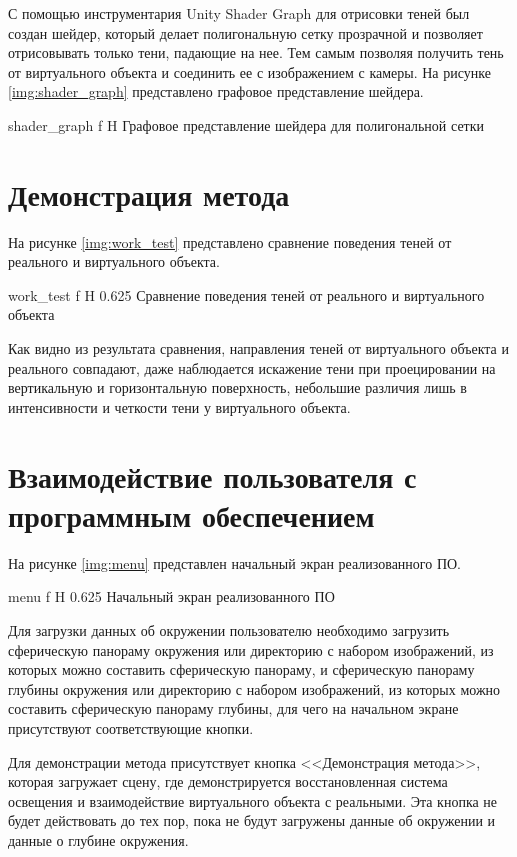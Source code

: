 С помощью инструментария Unity Shader Graph \cite{shader_graph} для отрисовки теней был создан шейдер, который делает полигональную сетку прозрачной и позволяет отрисовывать только тени, падающие на нее. Тем самым позволяя получить тень от виртуального объекта и соединить ее с изображением с камеры. На рисунке \ref{img:shader_graph} представлено графовое представление шейдера.

{shader_graph}
{f}
{H}
{\textwidth}
{Графовое представление шейдера для полигональной сетки}

\section{Демонстрация метода}

На рисунке \ref{img:work_test} представлено сравнение поведения теней от реального и виртуального объекта.

{work_test}
{f}
{H}
{0.625\textwidth}
{Сравнение поведения теней от реального и виртуального объекта}

Как видно из результата сравнения, направления теней от виртуального объекта и реального совпадают, даже наблюдается искажение тени при проецировании на вертикальную и горизонтальную поверхность, небольшие различия лишь в интенсивности и четкости тени у виртуального объекта.

\section{Взаимодействие пользователя с программным обеспечением}

На рисунке \ref{img:menu} представлен начальный экран реализованного ПО.

{menu}
{f}
{H}
{0.625\textwidth}
{Начальный экран реализованного ПО}

Для загрузки данных об окружении пользователю необходимо загрузить сферическую панораму окружения или директорию с набором изображений, из которых можно составить сферическую панораму, и сферическую панораму глубины окружения или директорию с набором изображений, из которых можно составить сферическую панораму глубины, для чего на начальном экране присутствуют соответствующие кнопки.

Для демонстрации метода присутствует кнопка <<Демонстрация метода>>, которая загружает сцену, где демонстрируется восстановленная система освещения и взаимодействие виртуального объекта с реальными. Эта кнопка не будет действовать до тех пор, пока не будут загружены данные об окружении и данные о глубине окружения. 

